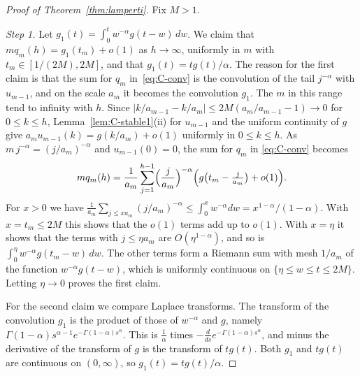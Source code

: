 \begin{proof}[Proof of Theorem~\ref{thm:lamperti}]
Fix $M>1$.

\emph{Step 1.} Let $g_1(t)=\int_0^tw^{-\alpha}g(t-w)\,dw$. We claim that
$mq_m(h)=g_1(t_m)+o(1)$ as $h\to\infty$, uniformly in $m$ with $t_m\in[1/(2M),2M]$, and
that $g_1(t)=tg(t)/\alpha$. The reason for the first claim is that the sum for $q_m$
in~\eqref{eq:C-conv} is the convolution of the tail $j^{-\alpha}$ with $u_{m-1}$, and on
the scale $a_m$ it becomes the convolution $g_1$. The $m$ in this range tend to
infinity with $h$. Since
$\lvert k/a_{m-1}-k/a_m\rvert\le2M(a_m/a_{m-1}-1)\to0$ for $0\le k\le h$,
Lemma~\ref{lem:C-stable1}(ii) for $u_{m-1}$ and the uniform continuity of $g$ give
$a_mu_{m-1}(k)=g(k/a_m)+o(1)$ uniformly in $0\le k\le h$. As
$m\,j^{-\alpha}=(j/a_m)^{-\alpha}$ and $u_{m-1}(0)=0$, the sum for $q_m$ in
\eqref{eq:C-conv} becomes
\[
mq_m(h)=\frac1{a_m}\sum_{j=1}^{h-1}\Bigl(\frac j{a_m}\Bigr)^{-\alpha}
\Bigl(g\bigl(t_m-\tfrac j{a_m}\bigr)+o(1)\Bigr).
\]
For $x>0$ we have
$\frac1{a_m}\sum_{j\le xa_m}(j/a_m)^{-\alpha}\le\int_0^xw^{-\alpha}dw=x^{1-\alpha}/(1-\alpha)$.
With $x=t_m\le2M$ this shows that the $o(1)$ terms add up to $o(1)$. With $x=\eta$ it
shows that the terms with $j\le\eta a_m$ are $O(\eta^{1-\alpha})$, and so is
$\int_0^\eta w^{-\alpha}g(t_m-w)\,dw$. The other terms form a Riemann sum with mesh
$1/a_m$ of the function $w^{-\alpha}g(t-w)$, which is uniformly continuous on
$\{\eta\le w\le t\le2M\}$. Letting $\eta\to0$ proves the first claim.

For the second claim we compare Laplace transforms. The transform of the convolution
$g_1$ is the product of those of $w^{-\alpha}$ and $g$, namely
$\Gamma(1-\alpha)s^{\alpha-1}e^{-\Gamma(1-\alpha)s^\alpha}$. This is $\frac1\alpha$ times
$-\frac d{ds}e^{-\Gamma(1-\alpha)s^\alpha}$, and minus the derivative of the transform of
$g$ is the transform of $tg(t)$. Both $g_1$ and $tg(t)$ are continuous on $(0,\infty)$,
so $g_1(t)=tg(t)/\alpha$.


\end{proof}
